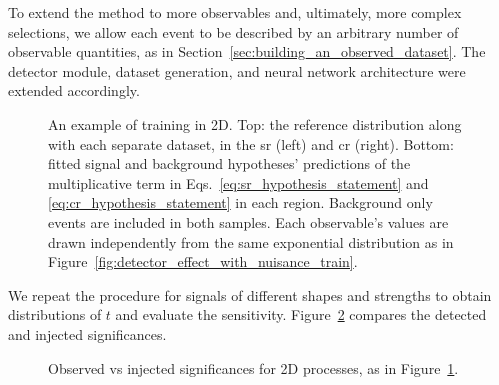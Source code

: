 \documentclass[paper/ddppaper2.tex]{subfiles}
\begin{document}
To extend the method to more observables and, ultimately, more complex selections, we allow each event to be described by an arbitrary number of observable quantities, as in Section~\ref{sec:building_an_observed_dataset}. The detector module, dataset generation, and neural network architecture were extended accordingly.

\begin{figure}
    \caption{An example of training in 2D. Top: the reference distribution along with each separate dataset, in the \gls{sr} (left) and \gls{cr} (right). Bottom: fitted signal and background hypotheses' predictions of the multiplicative term in Eqs.~\ref{eq:sr_hypothesis_statement} and \ref{eq:cr_hypothesis_statement} in each region. Background only events are included in both samples. Each observable's values are drawn independently from the same exponential distribution as in Figure~\ref{fig:detector_effect_with_nuisance_train}.}
    \label{fig:2d_train}
\end{figure}

We repeat the procedure for signals of different shapes and strengths to obtain distributions of $t$ and evaluate the sensitivity. Figure~\ref{fig:2d_significances} compares the detected and injected significances.

\begin{figure}
    \caption{Observed vs injected significances for 2D processes, as in Figure~\ref{fig:2d_train}.}
    \label{fig:2d_significances}
\end{figure}
\end{document}
